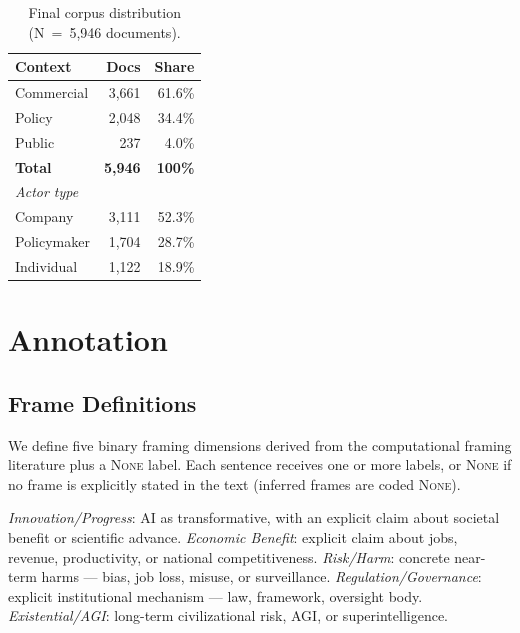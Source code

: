 \documentclass[11pt,a4paper,twocolumn]{article}
\begin{document}
\begin{table}[t]
\centering
\caption{Final corpus distribution (N~=~5,946 documents).}
\label{tab:corpus}
\small
\begin{tabular}{lrr}
\toprule
\textbf{Context} & \textbf{Docs} & \textbf{Share} \\
\midrule
Commercial       & 3,661  & 61.6\%  \\
Policy           & 2,048  & 34.4\%  \\
Public           &   237  &  4.0\%  \\
\midrule
\textbf{Total}   & \textbf{5,946} & \textbf{100\%} \\
\midrule[0.3pt]
\multicolumn{3}{l}{\small\textit{Actor type}} \\
Company          & 3,111  & 52.3\%  \\
Policymaker      & 1,704  & 28.7\%  \\
Individual       & 1,122  & 18.9\%  \\
\bottomrule
\end{tabular}
\end{table}


\section{Annotation}

\subsection{Frame Definitions}

We define five binary framing dimensions derived from the computational
framing literature \citep{card2015media} plus a \textsc{None} label.
Each sentence receives one or more labels, or \textsc{None} if no frame
is explicitly stated in the text (inferred frames are coded \textsc{None}).

\vspace{3pt}
\noindent\textit{Innovation/Progress}: AI as transformative, with an explicit claim about societal benefit or scientific advance.
\textit{Economic Benefit}: explicit claim about jobs, revenue, productivity, or national competitiveness.
\textit{Risk/Harm}: concrete near-term harms — bias, job loss, misuse, or surveillance.
\textit{Regulation/Governance}: explicit institutional mechanism — law, framework, oversight body.
\textit{Existential/AGI}: long-term civilizational risk, AGI, or superintelligence.
\vspace{3pt}
\end{document}
